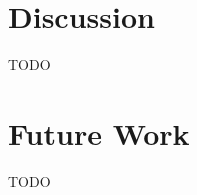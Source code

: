 \documentclass[botnum, fleqn]{unmeethesis}
\begin{document}
\chapter{Discussion}
TODO


\chapter{Future Work}
TODO

\vspace{4\baselineskip}\vspace{-\parskip} %
\footnotesize %

\end{document}
